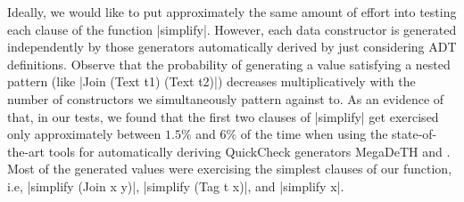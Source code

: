 Ideally, we would like to put approximately the same amount of effort into
testing each clause of the function |simplify|.
%
However, each data constructor is generated independently by those generators
automatically derived by just considering ADT definitions.
Observe that the probability of generating a value satisfying a nested pattern
(like |Join (Text t1) (Text t2)|) decreases multiplicatively with the number of
constructors we simultaneously pattern against to.
%
As an evidence of that, in our tests, we found that the first two clauses of
|simplify| get exercised only approximately between $1.5\%$ and $6\%$ of the
time when using the state-of-the-art tools for automatically deriving QuickCheck
generators MegaDeTH \cite{GriecoCB16} and {\dragen}
\cite{DBLP:conf/haskell/MistaRH18}.
%
Most of the generated values were exercising the simplest clauses of our
function, i.e, |simplify (Join x y)|, |simplify (Tag t x)|, and |simplify x|.






